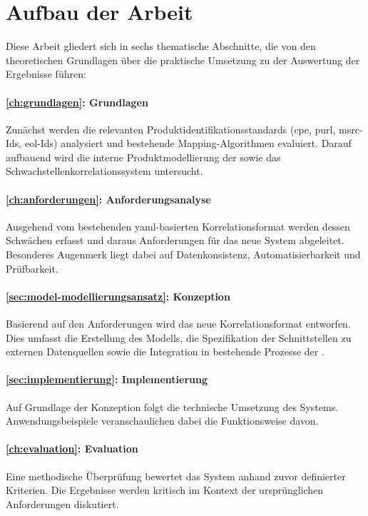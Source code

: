 \section{Aufbau der Arbeit}\label{sec:arbeit-aufbau}

Diese Arbeit gliedert sich in sechs thematische Abschnitte, die von den theoretischen Grundlagen über die praktische Umsetzung zu der Auswertung der Ergebnisse führen:

\paragraph{\autoref{ch:grundlagen}: Grundlagen}
Zunächst werden die relevanten Produktidentifikationsstandards (\acrshort{cpe}, \acrshort{purl}, \acrshort{msrc}-Ids, \acrshort{eol}-Ids) analysiert und bestehende Mapping-Algorithmen evaluiert.
Darauf aufbauend wird die interne Produktmodellierung der \metaeffektsp sowie das Schwachstellenkorrelationssystem untersucht.

\paragraph{\autoref{ch:anforderungen}: Anforderungsanalyse}
Ausgehend vom bestehenden \acrshort{yaml}-basierten Korrelationsformat werden dessen Schwächen erfasst und daraus Anforderungen für das neue System abgeleitet.
Besonderes Augenmerk liegt dabei auf Datenkonsistenz, Automatisierbarkeit und Prüfbarkeit.

\paragraph{\autoref{sec:model-modellierungsansatz}: Konzeption}
Basierend auf den Anforderungen wird das neue Korrelationsformat entworfen.
Dies umfasst die Erstellung des Modells, die Spezifikation der Schnittstellen zu externen Datenquellen sowie die Integration in bestehende Prozesse der \metaeffekt.

\paragraph{\autoref{sec:implementierung}: Implementierung}
Auf Grundlage der Konzeption folgt die technische Umsetzung des Systems.
Anwendungsbeispiele veranschaulichen dabei die Funktionsweise davon.

\paragraph{\autoref{ch:evaluation}: Evaluation}
Eine methodische Überprüfung bewertet das System anhand zuvor definierter Kriterien.
Die Ergebnisse werden kritisch im Kontext der ursprünglichen Anforderungen diskutiert.

